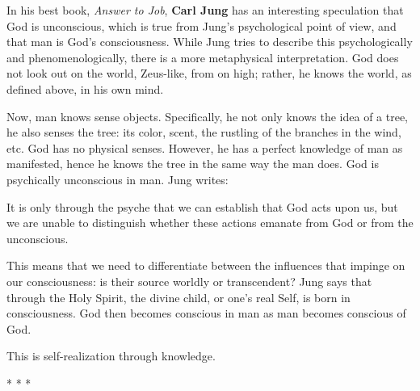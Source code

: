 In his best book, \emph{Answer to Job}, \textbf{Carl Jung} has an interesting speculation that God is unconscious, which is true from Jung's psychological point of view, and that man is God's consciousness. While Jung tries to describe this psychologically and phenomenologically, there is a more metaphysical interpretation. God does not look out on the world, Zeus-like, from on high; rather, he knows the world, as defined above, in his own mind.

Now, man knows sense objects. Specifically, he not only knows the idea of a tree, he also senses the tree: its color, scent, the rustling of the branches in the wind, etc. God has no physical senses. However, he has a perfect knowledge of man as manifested, hence he knows the tree in the same way the man does. God is psychically unconscious in man. Jung writes:

\begin{quotex}
It is only through the psyche that we can establish that God acts upon us, but we are unable to distinguish whether these actions emanate from God or from the unconscious.

\end{quotex}
This means that we need to differentiate between the influences that impinge on our consciousness: is their source worldly or transcendent? Jung says that through the Holy Spirit, the divine child, or one's real Self, is born in consciousness. God then becomes conscious in man as man becomes conscious of God.

This is self-realization through knowledge.




\begin{center}* * *\end{center}

